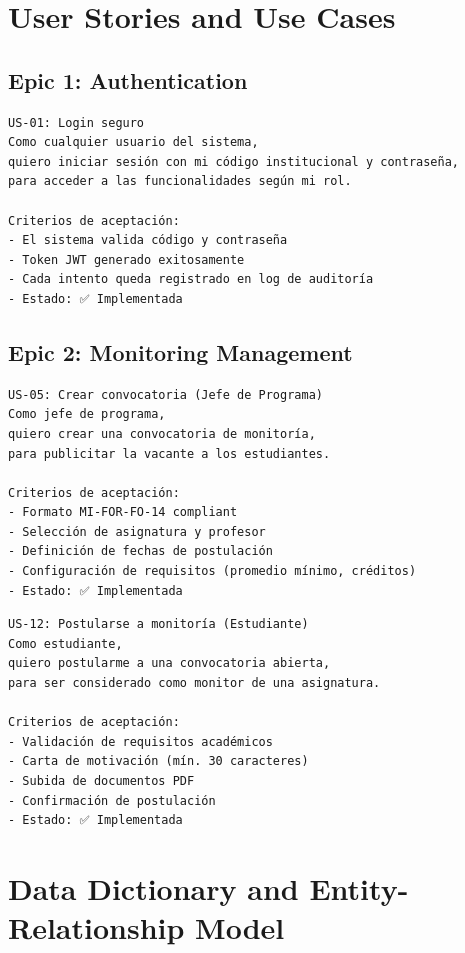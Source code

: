 \documentclass[12pt,a4paper]{report}
\begin{document}
\chapter{User Stories and Use Cases}

\section{Epic 1: Authentication}

\begin{verbatim}
US-01: Login seguro
Como cualquier usuario del sistema,
quiero iniciar sesión con mi código institucional y contraseña,
para acceder a las funcionalidades según mi rol.

Criterios de aceptación:
- El sistema valida código y contraseña
- Token JWT generado exitosamente
- Cada intento queda registrado en log de auditoría
- Estado: ✅ Implementada
\end{verbatim}

\section{Epic 2: Monitoring Management}

\begin{verbatim}
US-05: Crear convocatoria (Jefe de Programa)
Como jefe de programa,
quiero crear una convocatoria de monitoría,
para publicitar la vacante a los estudiantes.

Criterios de aceptación:
- Formato MI-FOR-FO-14 compliant
- Selección de asignatura y profesor
- Definición de fechas de postulación
- Configuración de requisitos (promedio mínimo, créditos)
- Estado: ✅ Implementada
\end{verbatim}

\begin{verbatim}
US-12: Postularse a monitoría (Estudiante)
Como estudiante,
quiero postularme a una convocatoria abierta,
para ser considerado como monitor de una asignatura.

Criterios de aceptación:
- Validación de requisitos académicos
- Carta de motivación (mín. 30 caracteres)
- Subida de documentos PDF
- Confirmación de postulación
- Estado: ✅ Implementada
\end{verbatim}

\chapter{Data Dictionary and Entity-Relationship Model}
\end{document}

